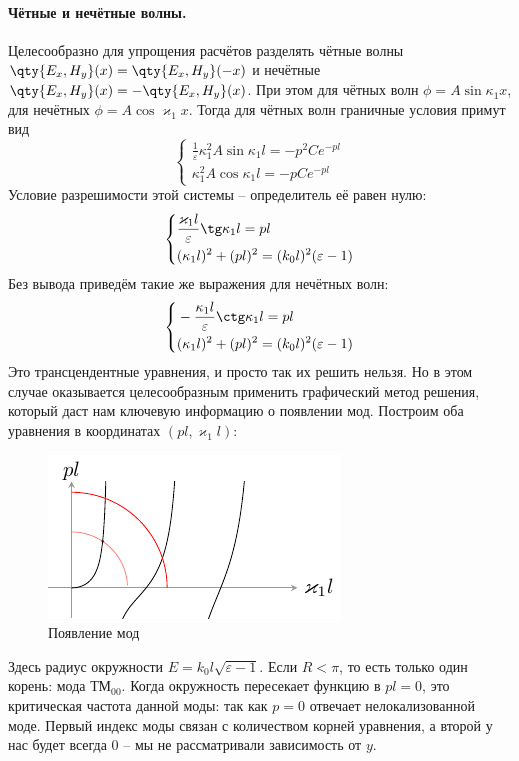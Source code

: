\paragraph{Чётные и нечётные волны. } Целесообразно для упрощения расчётов разделять чётные волны $\qty{E_x,H_y}(x)=\qty{E_x,H_y}(-x)$ и нечётные $\qty{E_x,H_y}(x)=-\qty{E_x,H_y}(x)$. При этом для чётных волн $\phi=A\sin\kappa_1 x$, для нечётных $\phi=A\cos \varkappa_1 x$. Тогда для чётных волн граничные условия примут вид
\begin{equation}
    \left\{\begin{aligned}
            \frac{1}{\varepsilon}\kappa_1^2 A\sin\kappa_1 l = -p^2 C e^{-pl}\\
            \kappa_1^2 A \cos \kappa_1 l = -p C e^{-pl} 
    \end{aligned}\right.
\end{equation}
Условие разрешимости этой системы -- определитель её равен нулю:
\begin{equation}
    \left\{\begin{aligned}
            &\frac{\varkappa_1 l}{\varepsilon} \tg \kappa_1 l = pl\\
            &(\kappa_1 l)^2 +  (pl)^2 = (k_0 l)^2 (\varepsilon-1)
    \end{aligned}\right.
\end{equation}
Без вывода приведём такие же выражения для нечётных волн:
\begin{equation}
    \left\{\begin{aligned}
        &-\frac{\kappa_1 l}{\varepsilon} \ctg \kappa_1 l = pl\\
        &(\kappa_1 l)^2 +  (pl)^2 = (k_0 l)^2 (\varepsilon-1)
    \end{aligned}\right.
\end{equation}
Это трансцендентные уравнения, и просто так их решить нельзя. Но в этом случае оказывается целесообразным применить графический метод решения, который даст нам ключевую информацию о появлении мод. Построим оба уравнения в координатах $(pl, \varkappa_1 l)$:
\begin{figure}[H]
    \centering
    \includegraphics[scale=1.5]{img3/1}
    \caption{Появление мод}
    \label{fig:}
\end{figure}
Здесь радиус окружности $E=k_0 l \sqrt{\varepsilon-1}$. Если $R<\pi$, то есть только один корень: мода ТМ${}_{00}$. Когда окружность пересекает функцию в $pl=0$, это критическая частота данной моды: так как $p=0$ отвечает нелокализованной моде. Первый индекс моды связан с количеством корней уравнения, а второй у нас будет всегда 0 -- мы не рассматривали зависимость от $y$.
